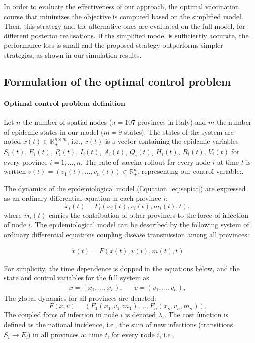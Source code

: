 In order to evaluate the effectiveness of our approach, the optimal vaccination course that minimizes the objective is computed based on the simplified model. Then, this strategy and the alternative ones are evaluated on the full model, for different posterior realisations. If the simplified model is sufficiently accurate, the performance loss is small and the proposed strategy outperforms simpler strategies, as shown in our simulation results.

\subsection{Formulation of the optimal control problem}
\paragraph{Optimal control problem definition}Let $n$ the number of spatial nodes ($n=107$ provinces in Italy) and $m$ the number of epidemic states in our model ($m=9$ states).
The states of the system are noted $x(t) \in \mathbb{R}_+^{n\times m}$, i.e., $x(t)$ is a vector containing the epidemic variables $S_i(t)$, $E_i(t)$, $P_i(t)$, $I_i(t)$, $A_i(t)$, $Q_i(t)$, $H_i(t)$, $R_i(t)$, $V_i(t)$ for every province $i=1,...,n$. The rate of vaccine rollout for every node $i$ at time $t$ is written $v(t) = (v_1(t),...,v_n(t)) \in \mathbb{R}_+^{n}$, representing our control variable:. %

The dynamics of the epidemiological model (Equation~\eqref{eq:sepiar}) are expressed as an ordinary differential equation in each province $i$:
\begin{equation}
    \label{eq:sepiar_compact}
    \dot x_i(t) = F_i(x_i(t),v_i(t), m_i(t), t),
\end{equation}
where $m_i(t)$ carries the contribution of other provinces to the force of infection of node $i$. The epidemiological model can be described by the following system of ordinary differential equations coupling disease transmission among all provinces:

\begin{align}
    \dot x(t) = F(x(t),v(t),m(t),t)
    \label{eq:dynamics}
\end{align}

For simplicity, the time dependence is dopped in the equations below, and the state and control variables for the full system as
\begin{align*}
    x = (x_1,\ldots,x_n), && v = (v_1,\ldots,v_n),
\end{align*}
The global dynamics for all provinces are denoted:
\begin{equation*}
    F(x,v) = (F_1(x_1,v_1, m_1),\ldots,F_n(x_n,v_n, m_n)).
\end{equation*}
The coupled force of infection in node $i$ is denoted $\lambda_i$. The cost function is defined as the national incidence, i.e., the sum of new infections (transitions $S_i\longrightarrow E_i$) in all provinces at time $t$,  for every node $i$, i.e.,

